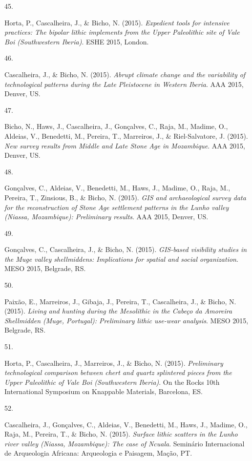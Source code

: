 \documentclass[11pt,a4paper,]{awesome-cv}
\newlength{\cslhangindent}
\newlength{\csllabelwidth}
\newenvironment{CSLReferences}[2] %
 {\begin{list}{}{%
  \setlength{\itemindent}{0pt}
  \setlength{\leftmargin}{0pt}
  \setlength{\parsep}{0pt}
  \ifodd #1
   \setlength{\leftmargin}{\cslhangindent}
   \setlength{\itemindent}{-1\cslhangindent}
  \fi
  \setlength{\itemsep}{#2\baselineskip}}}
 {\end{list}}
\newcommand{\CSLLeftMargin}[1]{\parbox[t]{\csllabelwidth}{\strut#1\strut}}
\newcommand{\CSLRightInline}[1]{\parbox[t]{\linewidth - \csllabelwidth}{\strut#1\strut}}
\begin{document}
\begin{CSLReferences}{0}{0}
\CSLLeftMargin{45. }%
\CSLRightInline{Horta, P., Cascalheira, J., \& Bicho, N. (2015).
\emph{Expedient tools for intensive practices: The bipolar lithic
implements from the Upper Paleolithic site of Vale Boi (Southwestern
Iberia)}. ESHE 2015, London.}

\CSLLeftMargin{46. }%
\CSLRightInline{Cascalheira, J., \& Bicho, N. (2015). \emph{Abrupt
climate change and the variability of technological patterns during the
Late Pleistocene in Western Iberia}. AAA 2015, Denver, US.}

\CSLLeftMargin{47. }%
\CSLRightInline{Bicho, N., Haws, J., Cascalheira, J., Gonçalves, C.,
Raja, M., Madime, O., Aldeias, V., Benedetti, M., Pereira, T.,
Marreiros, J., \& Riel-Salvatore, J. (2015). \emph{New survey results
from Middle and Late Stone Age in Mozambique}. AAA 2015, Denver, US.}

\CSLLeftMargin{48. }%
\CSLRightInline{Gonçalves, C., Aldeias, V., Benedetti, M., Haws, J.,
Madime, O., Raja, M., Pereira, T., Zinsious, B., \& Bicho, N. (2015).
\emph{GIS and archaeological survey data for the reconstruction of Stone
Age settlement patterns in the Lunho valley (Niassa, Mozambique):
Preliminary results}. AAA 2015, Denver, US.}

\CSLLeftMargin{49. }%
\CSLRightInline{Gonçalves, C., Cascalheira, J., \& Bicho, N. (2015).
\emph{GIS-based visibility studies in the Muge valley shellmiddens:
Implications for spatial and social organization}. MESO 2015, Belgrade,
RS.}

\CSLLeftMargin{50. }%
\CSLRightInline{Paixão, E., Marreiros, J., Gibaja, J., Pereira, T.,
Cascalheira, J., \& Bicho, N. (2015). \emph{Living and hunting during
the Mesolithic in the Cabeço da Amoreira Shellmidden (Muge, Portugal):
Preliminary lithic use-wear analysis}. MESO 2015, Belgrade, RS.}

\CSLLeftMargin{51. }%
\CSLRightInline{Horta, P., Cascalheira, J., Marreiros, J., \& Bicho, N.
(2015). \emph{Preliminary technological comparison between chert and
quartz splintered pieces from the Upper Paleolithic of Vale Boi
(Southwestern Iberia)}. On the Rocks 10th International Symposium on
Knappable Materials, Barcelona, ES.}

\CSLLeftMargin{52. }%
\CSLRightInline{Cascalheira, J., Gonçalves, C., Aldeias, V., Benedetti,
M., Haws, J., Madime, O., Raja, M., Pereira, T., \& Bicho, N. (2015).
\emph{Surface lithic scatters in the Lunho river valley (Niassa,
Mozambique): The case of Ncuala}. Seminário Internacional de Arqueologia
Africana: Arqueologia e Paisagem, Mação, PT.}


\end{CSLReferences}
\end{document}
